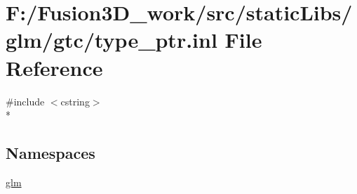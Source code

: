 \hypertarget{type__ptr_8inl}{}\section{F\+:/\+Fusion3\+D\+\_\+work/src/static\+Libs/glm/gtc/type\+\_\+ptr.inl File Reference}
\label{type__ptr_8inl}
{\ttfamily \#include $<$cstring$>$}\\*
\subsection*{Namespaces}
\begin{DoxyCompactItemize}
\item 
 \hyperlink{namespaceglm}{glm}
\end{DoxyCompactItemize}
